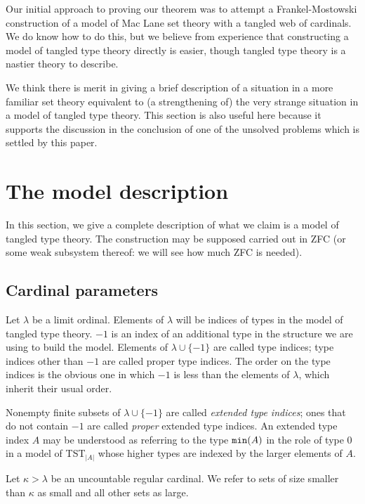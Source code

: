 \documentclass[112pt]{article}
\begin{document}
Our initial approach to proving our theorem was to attempt a Frankel-Mostowski construction of a model of Mac Lane set theory with a tangled web of cardinals.  We do know how to do this, but we believe from experience that constructing a model of tangled type theory directly is easier, though tangled type theory is a nastier theory to describe.

We think there is merit in giving a brief description of a situation in a more familiar set theory equivalent to (a strengthening of) the very strange situation in a model of tangled type theory.  This section is also useful here because it supports the discussion in the conclusion of one of the unsolved problems which is settled by this paper.

\newpage




\section{The model description}

In this section, we give a complete description of what we claim is a model of tangled type theory.  The construction may be supposed carried out in ZFC (or some weak subsystem thereof:  we will see how much ZFC is needed).

\subsection{Cardinal parameters}

Let $\lambda$ be a limit ordinal.  Elements of $\lambda$ will be indices of types in the model of tangled type theory.  $-1$ is an index of an additional type in the structure we are using to build the model.  Elements of $\lambda \cup \{-1\}$ are called type indices;  type indices other than $-1$ are called proper type indices.  The order on the type indices is the obvious one in which $-1$ is less than the elements of $\lambda$, which inherit their usual order.

Nonempty finite subsets of $\lambda \cup \{-1\}$ are called {\em extended type indices\/};  ones that do not contain $-1$ are called {\em proper\/} extended type indices.   An extended type index $A$ may be understood as referring to the type ${\tt min}(A)$ in the role of type 0 in a model of TST$_{|A|}$ whose higher types are indexed by the larger elements of $A$.

Let $\kappa>\lambda$ be an uncountable regular cardinal.  We refer to sets of size smaller than $\kappa$ as small and all other sets as large.
\end{document}
